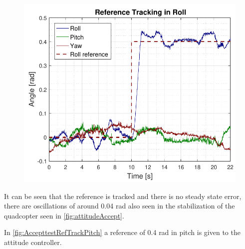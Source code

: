 \begin{figure}[H]
	\includegraphics[scale=.65]{figures/AccepttestRefTrackRoll.pdf}
	\centering			
	\label{fig:AccepttestRefTrackRoll}
\end{figure}

It can be seen that the reference is tracked and there is no steady state error, there are oscillations of around 0.04 rad also seen in the stabilization of the quadcopter seen in \autoref{fig:attitudeAccept}.

In \autoref{fig:AccepttestRefTrackPitch} a reference of 0.4 rad in pitch is given to the attitude controller.

